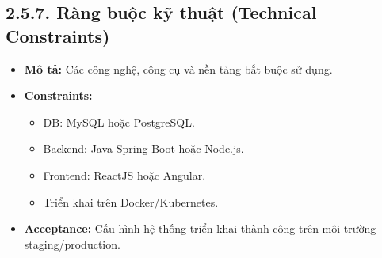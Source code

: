 
\subsection*{2.5.7. Ràng buộc kỹ thuật (Technical Constraints)}
\begin{itemize}
    \item \textbf{Mô tả:} Các công nghệ, công cụ và nền tảng bắt buộc sử dụng.
    \item \textbf{Constraints:}
    \begin{itemize}
        \item DB: MySQL hoặc PostgreSQL.
        \item Backend: Java Spring Boot hoặc Node.js.
        \item Frontend: ReactJS hoặc Angular.
        \item Triển khai trên Docker/Kubernetes.
    \end{itemize}
    \item \textbf{Acceptance:} Cấu hình hệ thống triển khai thành công trên môi trường staging/production.
\end{itemize}

